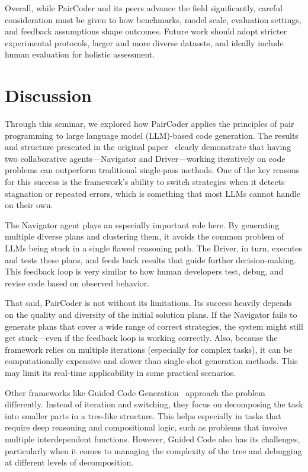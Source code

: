 \documentclass[11pt,a4paper]{article}
\begin{document}
Overall, while PairCoder and its peers advance the field significantly, careful consideration must be given to how benchmarks, model scale, evaluation settings, and feedback assumptions shape outcomes. Future work should adopt stricter experimental protocols, larger and more diverse datasets, and ideally include human evaluation for holistic assessment.










\section{Discussion}

Through this seminar, we explored how PairCoder applies the principles of pair programming to large language model (LLM)-based code generation. The results and structure presented in the original paper~\cite{zhang2024paircoder} clearly demonstrate that having two collaborative agents—Navigator and Driver—working iteratively on code problems can outperform traditional single-pass methods. One of the key reasons for this success is the framework's ability to switch strategies when it detects stagnation or repeated errors, which is something that most LLMs cannot handle on their own.

The Navigator agent plays an especially important role here. By generating multiple diverse plans and clustering them, it avoids the common problem of LLMs being stuck in a single flawed reasoning path. The Driver, in turn, executes and tests these plans, and feeds back results that guide further decision-making. This feedback loop is very similar to how human developers test, debug, and revise code based on observed behavior.

That said, PairCoder is not without its limitations. Its success heavily depends on the quality and diversity of the initial solution plans. If the Navigator fails to generate plans that cover a wide range of correct strategies, the system might still get stuck—even if the feedback loop is working correctly. Also, because the framework relies on multiple iterations (especially for complex tasks), it can be computationally expensive and slower than single-shot generation methods. This may limit its real-time applicability in some practical scenarios.

Other frameworks like Guided Code Generation~\cite{almorsi2025guided} approach the problem differently. Instead of iteration and switching, they focus on decomposing the task into smaller parts in a tree-like structure. This helps especially in tasks that require deep reasoning and compositional logic, such as problems that involve multiple interdependent functions. However, Guided Code also has its challenges, particularly when it comes to managing the complexity of the tree and debugging at different levels of decomposition.
\end{document}
